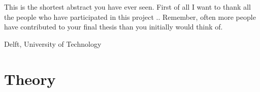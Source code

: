 \documentclass[a4paper,11pt]{mscThesis}
\begin{document}
%
\frontmatter %
%
    \maketitle
%

    This is the shortest abstract you have ever seen.
    \cleardoublepage
%
    First of all I want to thank all the people who have participated in this project ..
    Remember, often more people have contributed to your final thesis than you initially would think of.
    \vspace*{15mm}

    \noindent
    Delft, University of Technology \hfill \mscname\\ %
    \mscdate

%
    \tocloflot
%
    \printnomencl %
%
    \begin{acronym}%
    \end{acronym}%
    \cleardoublepage%
%
%
%
\mainmatter
%
\cleardoublepage

%
		
    \part{Theory}
    	
    	
		
\cite{Mahdad-Deblending-Method}

%
    
\end{document}

